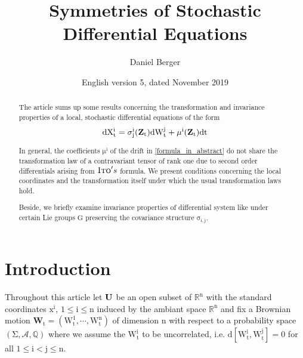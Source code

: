 \documentclass[10 pt,english]{smfart}
\title{Symmetries of Stochastic Differential Equations}
\date {English version 5, dated November 2019}
\author{Daniel Berger}
\newcommand{\G}{{\textrm{G}}}
\newcommand{\Z}{{\bf{Z}_{\textrm{t}}}}
\newcommand{\Wt}{\mathrm{\mathbf{W}}_{t}}
\newcommand{\U}{{\bf{U}}}
\begin{document}
\def\smfbyname{}

\begin{abstract}
The article sums up some results concerning the transformation and invariance properties of a local, stochastic differential equations of the form
\begin{equation}\label{formula_in_abstract}
\mathrm{d X^{i}_{t}= \sigma^{i}_{j}(\Z)dW^{j}_{t}+\mu^{i}(\Z)dt}
\end{equation} 

In general, the coefficients $\mathrm{\mu^{i}}$ of the drift in \ref{formula_in_abstract} do not share the transformation law of a contravariant tensor of rank one due to second order differentials arising from $\textsc{Ito}'s$ formula. We present conditions concerning the local coordinates and the transformation itself under which the usual transformation laws hold.

Beside, we briefly examine invariance properties of differential system like under certain Lie groups $\mathrm{\G}$ preserving the covariance structure $\mathrm{\sigma_{i,j}}$. 
\end{abstract}


\maketitle

\tableofcontents

\section{Introduction}\label{introduction}
Throughout this article let $\mathrm{\U}$ be an open subset of $\mathrm{\mathbb{R}^{n}}$ with the standard coordinates $\mathrm{x^{i}}$, $\mathrm{1\leq i\leq n}$ induced by the ambiant space $\mathrm{\mathbb{R}^{n}}$ and fix a Brownian motion $\mathrm{\Wt=\left(W^{1}_{t},\cdots,W^{n}_{t}\right)}$ of dimension $\mathrm{n}$ with respect to a probability space $\mathrm{\left(\Sigma, \mathscr{A},\mathbb{Q}\right)}$ where we assume the $\mathrm{W^{i}_{t}}$ to be uncorrelated, i.e. $\mathrm{d[W^{i}_{t},W^{j}_{t}]}=0$ for all $\mathrm{1\leq i < j\leq n}$.
\end{document}
